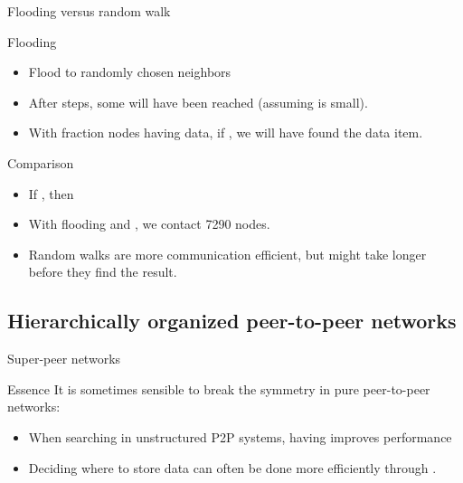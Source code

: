   \begin{slide}{Flooding versus random walk}
    \begin{block}{Flooding}
      \begin{itemize}\tightlist
      \item Flood to  randomly chosen neighbors
      \item After  steps, some  will have been reached (assuming
         is small).
      \item With fraction  nodes having data, if , we
        will have found the data item.
      \end{itemize}
    \end{block}
    \begin{exampleblock}{Comparison}
      \begin{itemize}
      \item If , then 
      \item With flooding and , we contact 7290 nodes.
      \item Random walks are more communication efficient, but might take longer before they find the result.
      \end{itemize}
    \end{exampleblock}
  \end{slide}
\subsection{Hierarchically organized peer-to-peer networks}
\begin{slide}{Super-peer networks}
  \begin{block}{Essence}
    It is sometimes sensible to break the symmetry in pure peer-to-peer networks:
    \begin{itemize}\tightlist
    \item When searching in unstructured P2P systems, having  improves performance
    \item Deciding where to store data can often be done more efficiently through .
    \end{itemize}
  \end{block}
  \begin{centerfig}
  \end{centerfig}
\end{slide}
